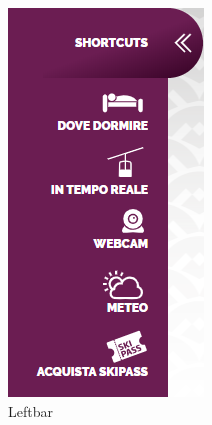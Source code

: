 \begin{figure}[h!]
	\centering
	\begin{minipage}[b]{0.28\textwidth}
    		\includegraphics[width=\textwidth]{./assets/Interaction-leftbar.png}
		\caption{Leftbar}
	\end{minipage}

\end{figure}
